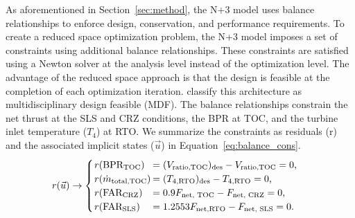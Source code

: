 \documentclass[conf]{new-aiaa}
\begin{document}
As aforementioned in Section~\ref{sec:method}, the N+3 model uses balance relationships to enforce design, conservation, and performance requirements.
To create a reduced space optimization problem, the N+3 model imposes a set of constraints using additional balance relationships.
These constraints are satisfied using a Newton solver at the analysis level instead of the optimization level.
The advantage of the reduced space approach is that the design is feasible at the completion of each optimization iteration.
\citet{Martins2013} classify this architecture as multidisciplinary design feasible (MDF).
The balance relationships constrain the net thrust at the SLS and CRZ conditions, the BPR at TOC, and the turbine inlet temperature ($T_4$) at RTO.
We summarize the constraints as residuals (r) and the associated implicit states ($\vec{u}$) in Equation~\eqref{eq:balance_cons}.
\begin{equation}
  \label{eq:balance_cons}
  r(\vec{u}) \rightarrow
  \begin{cases}
    \setlength{\tabcolsep}{1pt}
    \begin{tabular}{l l}
      $r(\text{BPR}_\text{TOC})$    & $= (V_\text{ratio,TOC})_\text{des} - V_\text{ratio,TOC} = 0$, \\
      $r(\dot{m}_\text{total,TOC})$ & $= (T_{4,\text{RTO}})_\text{des} - T_{4,\text{RTO}} = 0$,     \\
      $r(\text{FAR}_\text{CRZ})$    & $= 0.9 F_\text{net, TOC} - F_\text{net, CRZ} = 0$,            \\
      $r(\text{FAR}_\text{SLS})$    & $= 1.2553 F_\text{net,RTO} - F_\text{net, SLS} = 0$.          \\
    \end{tabular}
  \end{cases}
\end{equation}
\end{document}
